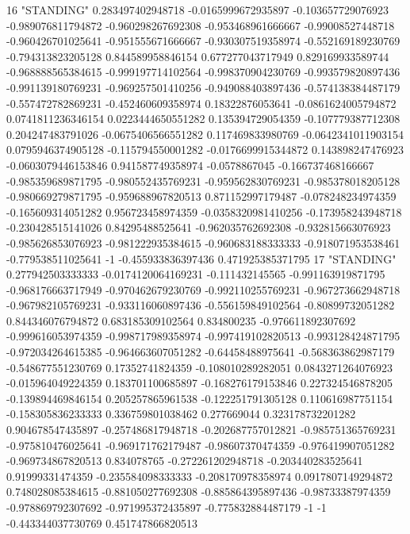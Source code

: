 16 "STANDING" 0.283497402948718 -0.0165999672935897 -0.103657729076923 -0.989076811794872 -0.960298267692308 -0.953468961666667 -0.99008527448718 -0.960426701025641 -0.951555671666667 -0.930307519358974 -0.552169189230769 -0.794313823205128 0.844589958846154 0.677277043717949 0.829169933589744 -0.968888565384615 -0.999197714102564 -0.998370904230769 -0.993579820897436 -0.991139180769231 -0.969257501410256 -0.949088403897436 -0.574138384487179 -0.557472782869231 -0.452460609358974 0.18322876053641 -0.0861624005794872 0.0741811236346154 0.0223444650551282 0.135394729054359 -0.107779387712308 0.204247483791026 -0.0675406566551282 0.117469833980769 -0.0642341011903154 0.0795946374905128 -0.115794550001282 -0.0176699915344872 0.143898247476923 -0.0603079446153846 0.941587749358974 -0.0578867045 -0.166737468166667 -0.985359689871795 -0.980552435769231 -0.959562830769231 -0.985378018205128 -0.980669279871795 -0.959688967820513 0.871152997179487 -0.078248234974359 -0.165609314051282 0.956723458974359 -0.0358320981410256 -0.173958243948718 -0.230428515141026 0.84295488525641 -0.962035762692308 -0.932815663076923 -0.985626853076923 -0.981222935384615 -0.960683188333333 -0.918071953538461 -0.779538511025641 -1 -0.455933836397436 0.471925385371795
17 "STANDING" 0.277942503333333 -0.0174120064169231 -0.111432145565 -0.991163919871795 -0.968176663717949 -0.970462679230769 -0.992110255769231 -0.967273662948718 -0.967982105769231 -0.933116060897436 -0.556159849102564 -0.80899732051282 0.844346076794872 0.683185309102564 0.834800235 -0.976611892307692 -0.999616053974359 -0.998717989358974 -0.997419102820513 -0.993128424871795 -0.972034264615385 -0.964663607051282 -0.64458488975641 -0.568363862987179 -0.548677551230769 0.17352741824359 -0.108010289282051 0.0843271264076923 -0.015964049224359 0.183701100685897 -0.168276179153846 0.227324546878205 -0.139894469846154 0.205257865961538 -0.122251791305128 0.110616987751154 -0.158305836233333 0.336759801038462 0.277669044 0.323178732201282 0.904678547435897 -0.257486817948718 -0.202687757012821 -0.985751365769231 -0.975810476025641 -0.969171762179487 -0.98607370474359 -0.976419907051282 -0.969734867820513 0.834078765 -0.272261202948718 -0.203440283525641 0.91999331474359 -0.235584098333333 -0.208170978358974 0.0917807149294872 0.748028085384615 -0.881050277692308 -0.885864395897436 -0.98733387974359 -0.978869792307692 -0.971995372435897 -0.775832884487179 -1 -1 -0.443344037730769 0.451747866820513
